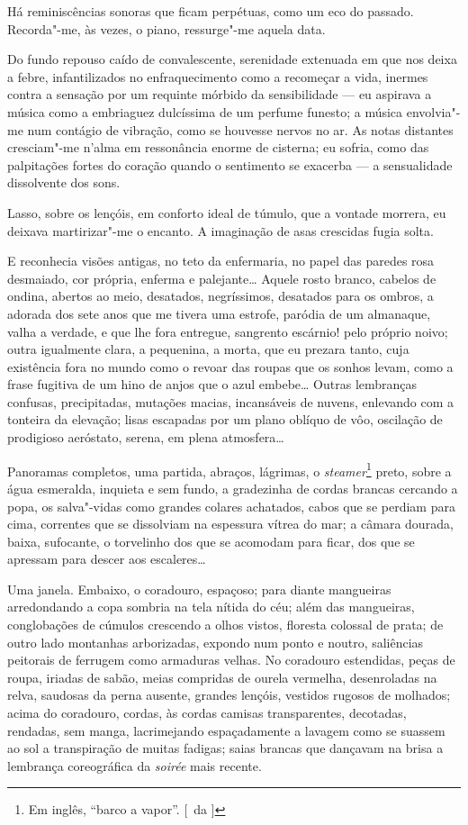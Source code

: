 Há reminiscências sonoras que ficam perpétuas, como um eco do passado.
Recorda"-me, às vezes, o piano, ressurge"-me aquela data. 

Do fundo repouso caído de convalescente, serenidade extenuada em que nos deixa a
febre, infantilizados no enfraquecimento como a recomeçar a vida,
inermes contra a sensação por um requinte mórbido da sensibilidade --- 
eu aspirava a música como a embriaguez dulcíssima de um perfume
funesto; a música envolvia"-me num contágio de vibração, como se
houvesse nervos no ar. As notas distantes cresciam"-me n'alma em
ressonância enorme de cisterna; eu sofria, como das palpitações fortes
do coração quando o sentimento se exacerba --- a sensualidade
dissolvente dos sons. 

Lasso, sobre os lençóis, em conforto ideal de
túmulo, que a vontade morrera, eu deixava martirizar"-me o encanto. A
imaginação de asas crescidas fugia solta. 

E reconhecia visões antigas,
no teto da enfermaria, no papel das paredes rosa desmaiado, cor
própria, enferma e palejante\ldots{} Aquele rosto branco, cabelos de ondina,
abertos ao meio, desatados, negríssimos, desatados para os ombros, a
adorada dos sete anos que me tivera uma estrofe, paródia
de um almanaque, valha a verdade, e que lhe fora entregue, sangrento
escárnio! pelo próprio noivo; outra igualmente clara, a pequenina, a
morta, que eu prezara tanto, cuja existência fora no mundo como o
revoar das roupas que os sonhos levam, como a frase fugitiva de um hino
de anjos que o azul embebe\ldots{} Outras lembranças confusas, precipitadas,
mutações macias, incansáveis de nuvens, enlevando com a tonteira da
elevação; lisas escapadas por um plano oblíquo de vôo, oscilação de
prodigioso aeróstato, serena, em plena atmosfera\ldots{} 

Panoramas completos, uma partida, abraços, lágrimas, o \textit{steamer}\footnote{ Em inglês, 
``barco a vapor''. [~da ]} preto, sobre a
água esmeralda, inquieta e sem fundo, a gradezinha de cordas brancas
cercando a popa, os salva"-vidas como grandes colares achatados, cabos
que se perdiam para cima, correntes que se dissolviam na espessura
vítrea do mar; a câmara dourada, baixa, sufocante, o torvelinho dos que
se acomodam para ficar, dos que se apressam para descer aos
escaleres\ldots{} 

Uma janela. Embaixo, o coradouro, espaçoso; para diante
mangueiras arredondando a copa sombria na tela nítida do céu; além das
mangueiras, conglobações de cúmulos crescendo a olhos vistos, floresta
colossal de prata; de outro lado montanhas arborizadas, expondo num
ponto e noutro, saliências peitorais de ferrugem como armaduras velhas.
No coradouro estendidas, peças de roupa, iriadas de sabão, meias
compridas de ourela vermelha, desenroladas na relva, saudosas da perna
ausente, grandes lençóis, vestidos rugosos de molhados; acima do
coradouro, cordas, às cordas camisas transparentes, decotadas,
rendadas, sem manga, lacrimejando espaçadamente a lavagem como se
suassem ao sol a transpiração de muitas fadigas; saias brancas que
dançavam na brisa a lembrança coreográfica da \textit{soirée} mais recente.

